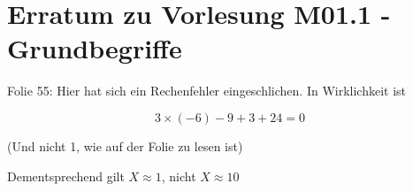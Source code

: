 \documentclass[pdflatex]{article}
\begin{document}
\section*{Erratum zu Vorlesung M01.1 - Grundbegriffe}


Folie 55: Hier hat sich ein Rechenfehler eingeschlichen. In Wirklichkeit ist 

\[
3\times(-6) -9 + 3 + 24 = 0
\]

(Und nicht 1, wie auf der Folie zu lesen ist)

Dementsprechend gilt \(X \approx 1\), nicht \(X \approx 10\)
\end{document}
